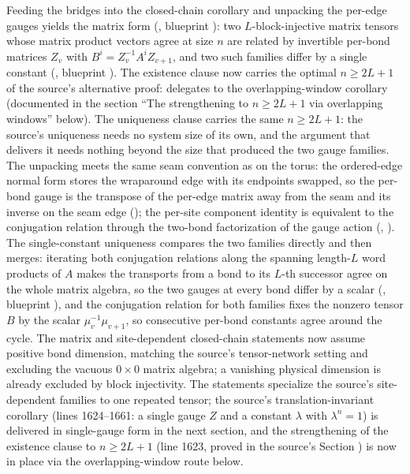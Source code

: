 \documentclass{article}
\begin{document}
Feeding the bridges into the closed-chain corollary and unpacking the
per-edge gauges yields the matrix form
(, blueprint
): two $L$-block-injective matrix
tensors whose matrix product vectors agree at size $n$ are related by
invertible per-bond matrices $Z_v$ with $B^i = Z_v^{-1} A^i Z_{v+1}$, and
two such families differ by a single constant
(, blueprint
).  The existence
clause now carries the optimal $n \ge 2L + 1$ of the source's alternative
proof:  delegates to the
overlapping-window corollary 
(documented in the section ``The strengthening to $n \ge 2L+1$ via
overlapping windows'' below).  The uniqueness clause carries the same
$n \ge 2L + 1$: the source's uniqueness needs no system size of its own, and
the argument that delivers it needs nothing beyond the size that produced
the two gauge families.  The unpacking
meets the same seam convention as on the torus: the ordered-edge normal
form stores the wraparound edge with its endpoints swapped, so the per-bond
gauge is the transpose of the per-edge matrix away from the seam and its
inverse on the seam edge (); the per-site
component identity is equivalent to the conjugation relation through the
two-bond factorization of the gauge action
(,
).  The single-constant uniqueness
compares the two families directly and then merges: iterating both
conjugation relations along the spanning length-$L$ word products of $A$
makes the transports from a bond to its $L$-th successor agree on the whole
matrix algebra, so the two gauges at every bond differ by a scalar
(, blueprint
), and the conjugation relation for
both families fixes the nonzero tensor $B$ by the scalar
$\mu_v^{-1}\mu_{v+1}$, so consecutive per-bond constants agree around the
cycle.  The matrix and site-dependent closed-chain statements now assume
positive bond dimension, matching the source's tensor-network setting and
excluding the vacuous $0\times0$ matrix algebra; a vanishing physical
dimension is already excluded by block injectivity.  The statements
specialize the source's
site-dependent families to one repeated tensor; the source's
translation-invariant corollary (lines 1624--1661: a single gauge $Z$ and a
constant $\lambda$ with $\lambda^n = 1$) is delivered in single-gauge form
in the next section, and the strengthening of the existence clause to
$n \ge 2L + 1$ (line 1623, proved in the source's Section
) is now in place via the overlapping-window route below.
\end{document}
